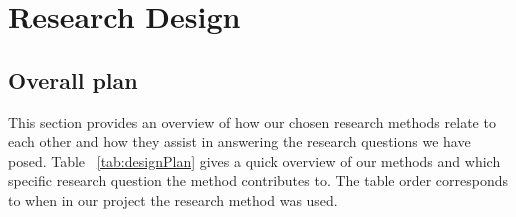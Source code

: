 \chapter{Research Design}

\section{Overall plan}

This section provides an overview of how our chosen research methods relate to each other and how they assist in answering the research questions we have posed. Table ~\ref{tab:designPlan} gives a quick overview of our methods and which specific research question the method contributes to.
The table order corresponds to when in our project the research method was used.

